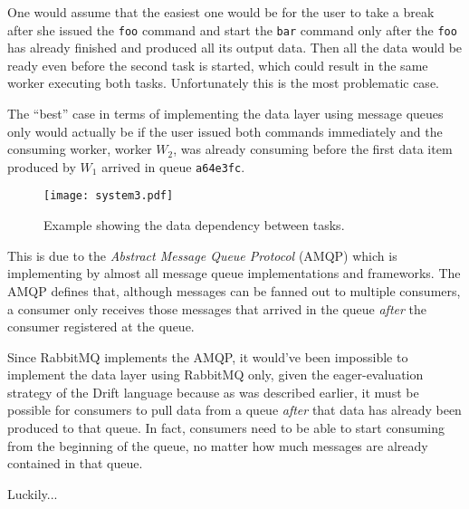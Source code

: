 One would assume that the easiest one would be for the user
to take a break after she issued the \texttt{foo} command and
start the \texttt{bar} command only after the \texttt{foo}
has already finished and produced all its output data.
Then all the data would be ready even before the second task
is started, which could result in the same worker executing
both tasks. Unfortunately this is the most problematic case.

The ``best'' case in terms of implementing the data layer
using message queues only would actually be if the user
issued both commands immediately and the consuming worker,
worker $W_{2}$, was already consuming before the first data
item produced by $W_{1}$ arrived in queue \texttt{a64e3fc}.

\begin{figure}[h]
  \texttt{[image: system3.pdf]}
  \caption{Example showing the data dependency between tasks.}
  \label{system3}
\end{figure}

This is due to the \textit{Abstract Message Queue Protocol}
(AMQP) which is implementing by almost all message queue
implementations and frameworks. The AMQP defines that,
although messages can be fanned out to multiple consumers,
a consumer only receives those messages that arrived in the
queue \textit{after} the consumer registered at the queue.

Since RabbitMQ implements the AMQP, it would've been impossible
to implement the data layer using RabbitMQ only, given the
eager-evaluation strategy of the Drift language because as was
described earlier, it must be possible for consumers to pull
data from a queue \textit{after} that data has already been
produced to that queue. In fact, consumers need to be able
to start consuming from the beginning of the queue, no matter
how much messages are already contained in that queue.

Luckily...





